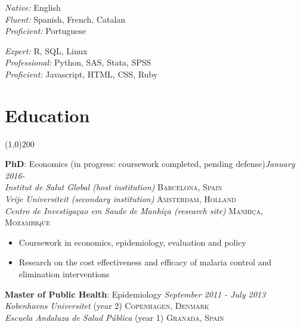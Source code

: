 \documentclass[11pt]{article}
\begin{document}
\begin{multicols}{2}

\noindent \emph{Native:} English\\
\noindent \emph{Fluent:} Spanish, French, Catalan\\
\noindent \emph{Proficient:} Portuguese

\vfill
\columnbreak


\noindent \emph{Expert:} R, SQL, Linux\\
\noindent \emph{Professional:} Python, SAS, Stata, SPSS\\
\noindent \emph{Proficient:} Javascript, HTML, CSS, Ruby


\end{multicols}



\section*{Education} %
\vspace{-7mm}
\line(1,0){200}
\vspace{2mm}

\noindent \textbf{PhD}: Economics (in progress: coursework completed, pending defense)\hfill \emph{January 2016-}\\
\noindent \emph{Institut de Salut Global (host institution)} \hfill \textsc{Barcelona, Spain} \\
\noindent \emph{Vrije Universiteit (secondary institution)} \hfill \textsc{Amsterdam, Holland} \\
\noindent \emph{Centro de Investigaçao em Saude de Manhiça (research site)} \hfill \textsc{Manhiça, Mozambique}

\vspace{-2mm}
\begin{itemize}\itemsep0pt \parskip0pt 
\item Coursework in economics, epidemiology, evaluation and policy
\item Research on the cost effectiveness and efficacy of malaria control and elimination interventions
\end{itemize}
\noindent \textbf{Master of Public Health}: Epidemiology \hfill \emph{September 2011 - July 2013} \\
\noindent \emph{Kobenhavns Universitet} (year 2) \hfill \textsc{Copenhagen, Denmark} \\
\noindent \emph{Escuela Andaluza de Salud Pública} (year 1) \hfill \textsc{Granada, Spain}
\end{document}
